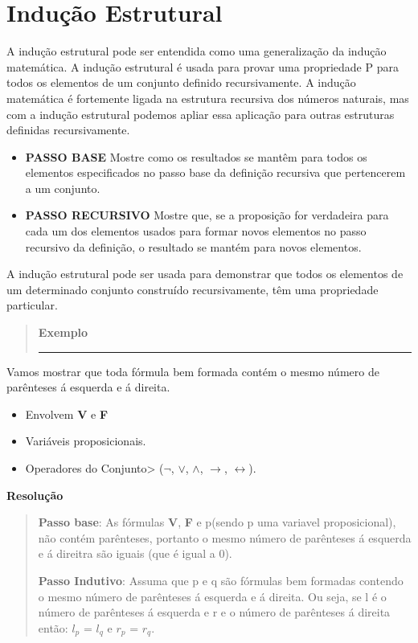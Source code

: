 \documentclass[a4paper, 10pt]{article}
\begin{document}
\section{Indução Estrutural}
A indução estrutural pode ser entendida como uma generalização da indução matemática. A indução estrutural é usada para provar uma propriedade P para todos os elementos de um conjunto definido recursivamente. A indução matemática é fortemente ligada na estrutura recursiva dos números naturais, mas com a indução estrutural podemos apliar essa aplicação para outras estruturas definidas recursivamente.
\begin{itemize}
\item \textbf{PASSO BASE} Mostre como os resultados se mantêm para todos os elementos especificados no passo base da definição recursiva que pertencerem a um conjunto.
\item \textbf{PASSO RECURSIVO} Mostre que, se a proposição for verdadeira para cada um dos elementos usados para formar novos elementos no passo recursivo da definição, o resultado se mantém para novos elementos.
\end{itemize}
A indução estrutural pode ser usada para demonstrar que todos os elementos de um determinado conjunto construído recursivamente, têm uma propriedade particular.
\begin{quote}
  \textbf{Exemplo}
  \hrule
\end{quote}
Vamos mostrar que toda fórmula bem formada contém o mesmo número de parênteses á esquerda e á direita.
\begin{itemize}
\item Envolvem \textbf{V} e \textbf{F}
\item Variáveis proposicionais.
\item Operadores do Conjunto> ({$\neg$, $\vee$, $\wedge$, $\to$, $\leftrightarrow$}).
\end{itemize}
\textbf{Resolução}
\begin{quote}
  \textbf{Passo base}: As fórmulas \textbf{V}, \textbf{F} e p(sendo p uma variavel proposicional), não contém parênteses, portanto o mesmo número de parênteses á esquerda e á direitra são iguais (que é igual a 0).

  \textbf{Passo Indutivo}: Assuma que p e q são fórmulas bem formadas contendo o mesmo número de parênteses á esquerda e á direita. Ou seja, se l é o número de parênteses á esquerda e r e o número de parênteses á direita então: $l_{p}$ = $l_{q}$ e $r_{p}$ = $r_{q}$.
\end{quote}
\end{document}
